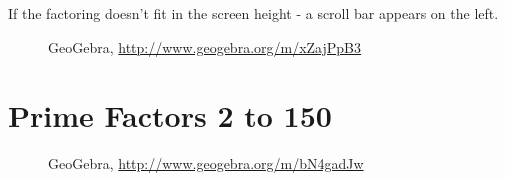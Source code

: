 If the factoring doesn't fit in the screen height - a scroll bar appears on the left.

\begin{figure}[H]
\begin{center}
\caption*{GeoGebra, \url{http://www.geogebra.org/m/xZajPpB3}}
\end{center}
\end{figure}

\section{{Prime Factors 2 to 150}}
\begin{figure}[H]
\begin{center}
\caption*{GeoGebra, \url{http://www.geogebra.org/m/bN4gadJw}}
\end{center}
\end{figure}

